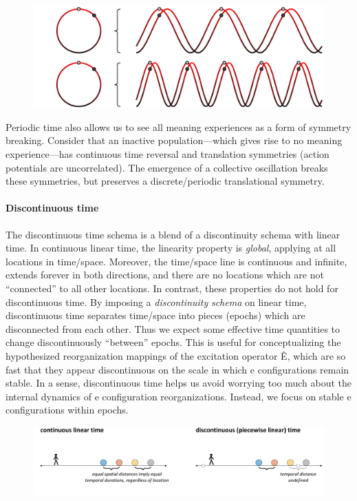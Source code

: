   
\begin{figure}
\includegraphics[width=\textwidth]{figures/Tilsen-img48.png}
\caption{\missingcaption}
\label{fig:}
\end{figure}
 

  Periodic time also allows us to see all meaning experiences as a form of symmetry breaking. Consider that an inactive population—which gives rise to no meaning experience—has continuous time reversal and translation symmetries (action potentials are uncorrelated). The emergence of a collective oscillation breaks these symmetries, but preserves a discrete/periodic translational symmetry.

\paragraph{Discontinuous time}

The discontinuous time schema is a blend of a discontinuity schema with linear time. In continuous linear time, the linearity property is \textit{global}, applying at all locations in time/space. Moreover, the time/space line is continuous and infinite, extends forever in both directions, and there are no locations which are not “connected” to all other locations. In contrast, these properties do not hold for discontinuous time. By imposing a \textit{discontinuity} \textit{schema} on linear time, discontinuous time separates time/space into pieces (epochs) which are disconnected from each other. Thus we expect some effective time quantities to change discontinuously “between” epochs. This is useful for conceptualizing the hypothesized reorganization mappings of the excitation operator Ê, which are so fast that they appear discontinuous on the scale in which e configurations remain stable. In a sense, discontinuous time helps us avoid worrying too much about the internal dynamics of e configuration reorganizations. Instead, we focus on stable e configurations within epochs.

  
\begin{figure}
\includegraphics[width=\textwidth]{figures/Tilsen-img49.png}
\caption{\missingcaption}
\label{fig:}
\end{figure}
 


